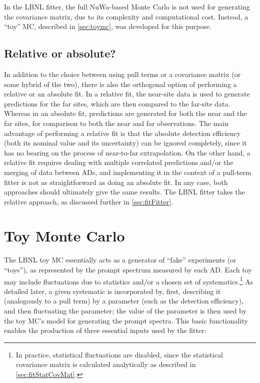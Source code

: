 \documentclass[../thesis.tex]{subfiles}
\begin{document}
In the LBNL fitter, the full NuWa-based Monte Carlo is not used for generating the covariance matrix, due to its complexity and computational cost. Instead, a ``toy'' MC, described in \autoref{sec:toymc}, was developed for this purpose.

\subsection{Relative or absolute?}
\label{sec:fitRelOrAbs}

In addition to the choice between using pull terms or a covariance matrix (or some hybrid of the two), there is also the orthogonal option of performing a relative or an absolute fit. In a relative fit, the near-site data is used to generate predictions for the far sites, which are then compared to the far-site data. Whereas in an absolute fit, predictions are generated for both the near and the far sites, for comparison to both the near and far observations. The main advantage of performing a relative fit is that the absolute detection efficiency (both its nominal value and its uncertainty) can be ignored completely, since it has no bearing on the process of near-to-far extrapolation. On the other hand, a relative fit requires dealing with multiple correlated predictions and/or the merging of data between ADs, and implementing it in the context of a pull-term fitter is not as straightforward as doing an absolute fit. In any case, both approaches should ultimately give the same results. The LBNL fitter takes the relative approach, as discussed further in \autoref{sec:fitFitter}.

\section{Toy Monte Carlo}
\label{sec:toymc}

The LBNL toy MC essentially acts as a generator of ``fake'' experiments (or ``toys''), as represented by the prompt spectrum measured by each AD. Each toy may include fluctuations due to statistics and/or a chosen set of systematics.\footnote{In practice, statistical fluctuations are disabled, since the statistical covariance matrix is calculated analytically as described in \autoref{sec:fitStatCovMat}.} As detailed later, a given systematic is incorporated by, first, describing it (analogously to a pull term) by a parameter (such as the detection efficiency), and then fluctuating the parameter; the value of the parameter is then used by the toy MC's model for generating the prompt spectra. This basic functionality enables the production of three essential inputs used by the fitter:
\end{document}
